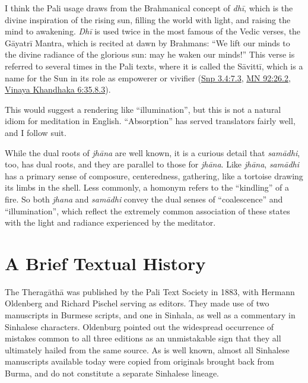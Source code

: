 \documentclass[12pt,openany]{book}%
\begin{document}
I think the Pali usage draws from the Brahmanical concept of \textit{\textsanskrit{dhī}}, which is the divine inspiration of the rising sun, filling the world with light, and raising the mind to awakening. \textit{\textsanskrit{Dhī}} is used twice in the most famous of the Vedic verses, the \textsanskrit{Gāyatrī} Mantra,  which is recited at dawn by Brahmans: “We lift our minds to the divine radiance of the glorious sun: may he waken our minds!” This verse is referred to several times in the Pali texts, where it is called the \textsanskrit{Sāvittī}, which is a name for the Sun in its role as empowerer or vivifier (\href{https://suttacentral.net/snp3.4/en/sujato\#7.3}{Snp 3.4:7.3}, \href{https://suttacentral.net/mn92/en/sujato\#26.2}{MN 92:26.2}, \href{https://suttacentral.net/pli-tv-kd6/en/brahmali\#35.8.3}{Vinaya Khandhaka 6:35.8.3}).

This would suggest a rendering like “illumination”, but this is not a natural idiom for meditation in English. “Absorption” has served translators fairly well, and I follow suit.

While the dual roots of \textit{\textsanskrit{jhāna}} are well known, it is a curious detail that \textit{\textsanskrit{samādhi}}, too, has dual roots, and they are parallel to those for \textit{\textsanskrit{jhāna}}. Like \textit{\textsanskrit{jhāna}}, \textit{\textsanskrit{samādhi}} has a primary sense of composure, centeredness, gathering, like a tortoise drawing its limbs in the shell. Less commonly, a homonym refers to the “kindling” of a fire. So both \textit{jhana} and \textit{\textsanskrit{samādhi}} convey the dual senses of “coalescence” and “illumination”, which reflect the extremely common association of these states with the light and radiance experienced by the meditator.

\section*{A Brief Textual History}

The \textsanskrit{Theragāthā} was published by the Pali Text Society in 1883, with Hermann Oldenberg and Richard Pischel serving as editors. They made use of two manuscripts in Burmese scripts, and one in Sinhala, as well as a commentary in Sinhalese characters. Oldenburg pointed out the widespread occurrence of mistakes common to all three editions as an unmistakable sign that they all ultimately hailed from the same source. As is well known, almost all Sinhalese manuscripts available today were copied from originals brought back from Burma, and do not constitute a separate Sinhalese lineage.
\end{document}
